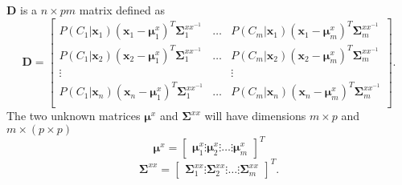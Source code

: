 $\mathbf{D}$ is a $n \times pm$ matrix defined as
\begin{equation}
	\label{eq:D_matrix}
	\mathbf{D} = \begin{bmatrix}
		P(C_1\vert \mathbf{x}_1)(\mathbf{x}_1 - \boldsymbol{\mu}_1^x)^T\mathbf{\Sigma}_1^{xx^{-1}} & \dots & P(C_m\vert \mathbf{x}_1)(\mathbf{x}_1 - \boldsymbol{\mu}_m^x)^T\mathbf{\Sigma}_m^{xx^{-1}} \\
		P(C_1\vert \mathbf{x}_2)(\mathbf{x}_2 - \boldsymbol{\mu}_1^x)^T\mathbf{\Sigma}_1^{xx^{-1}} & \dots & P(C_m\vert \mathbf{x}_2)(\mathbf{x}_2 - \boldsymbol{\mu}_m^x)^T\mathbf{\Sigma}_m^{xx^{-1}} \\
		\vdots & & \vdots \\
		P(C_1\vert \mathbf{x}_n)(\mathbf{x}_n - \boldsymbol{\mu}_1^x)^T\mathbf{\Sigma}_1^{xx^{-1}} & \dots & P(C_m\vert \mathbf{x}_n)(\mathbf{x}_n - \boldsymbol{\mu}_m^x)^T\mathbf{\Sigma}_m^{xx^{-1}} \\
	\end{bmatrix}.
\end{equation}
The two unknown matrices $\boldsymbol{\mu}^x$ and $\mathbf{\Sigma}^{xx}$ will have dimensions $m\times p$ and $m \times (p\times p)$ 
\begin{equation}
	\label{eq:v_matrix}
	\boldsymbol{\mu}^x = 
	\begin{bmatrix}
		\boldsymbol{\mu}^x_1 \vdots \boldsymbol{\mu}^x_2 \vdots \dots \vdots \boldsymbol{\mu}^x_m
	\end{bmatrix}^T
\end{equation}
\begin{equation}
	\label{gamma_matrix}
	\mathbf{\Sigma}^{xx} = 
	\begin{bmatrix}
		\mathbf{\Sigma}_1^{xx} \vdots \mathbf{\Sigma}_2^{xx} \vdots \dots \vdots \mathbf{\Sigma}_m^{xx}
	\end{bmatrix}^T.
\end{equation}


